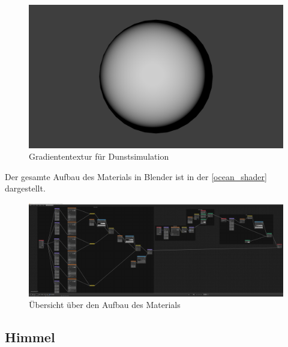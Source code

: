 \begin{figure}[H]
\includegraphics[width=\textwidth]{gfx/prod/ocean/meer6.jpg}
\caption{Gradiententextur für Dunstsimulation}
\label{meer6}
\end{figure}
\noindent
Der gesamte Aufbau des Materials in Blender ist in der \autoref{ocean_shader} dargestellt.

\begin{figure}[H]
\includegraphics[width=\textwidth]{gfx/prod/env/ocean_shader.jpg}
\caption{Übersicht über den Aufbau des Materials}
\label{ocean_shader}
\end{figure}
%
\subsection{Himmel}

